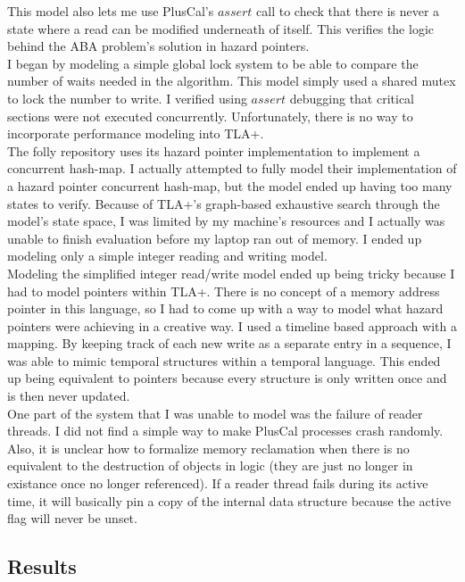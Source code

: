 \documentclass[11pt]{article}
\renewcommand{\_}{\rule{.4em}{.06em}\hspace{.05em}}
\renewcommand{\.}[1]{\ensuremath{\mbox{}#1\mbox{}}}
\begin{document}
This model also lets me use PlusCal's $assert$ call to check that there is never a state where a read can be modified underneath of itself. This verifies the logic behind the ABA problem's solution in hazard pointers. \\

I began by modeling a simple global lock system to be able to compare the number of waits needed in the algorithm. This model simply used a shared mutex to lock the number to write. I verified using $assert$ debugging that critical sections were not executed concurrently. Unfortunately, there is no way to incorporate performance modeling into TLA+. \\

The folly repository uses its hazard pointer implementation to implement a concurrent hash-map. I actually attempted to fully model their implementation of a hazard pointer concurrent hash-map, but the model ended up having too many states to verify. Because of TLA+'s graph-based exhaustive search through the model's state space, I was limited by my machine's resources and I actually was unable to finish evaluation before my laptop ran out of memory. I ended up modeling only a simple integer reading and writing model. \\

Modeling the simplified integer read/write model ended up being tricky because I had to model pointers within TLA+. There is no concept of a memory address pointer in this language, so I had to come up with a way to model what hazard pointers were achieving in a creative way. I used a timeline based approach with a mapping. By keeping track of each new write as a separate entry in a sequence, I was able to mimic temporal structures within a temporal language. This ended up being equivalent to pointers because every structure is only written once and is then never updated. \\

One part of the system that I was unable to model was the failure of reader threads. I did not find a simple way to make PlusCal processes crash randomly. Also, it is unclear how to formalize memory reclamation when there is no equivalent to the destruction of objects in logic (they are just no longer in existance once no longer referenced). If a reader thread fails during its active time, it will basically pin a copy of the internal data structure because the active flag will never be unset.

\subsection{Results}
\end{document}
